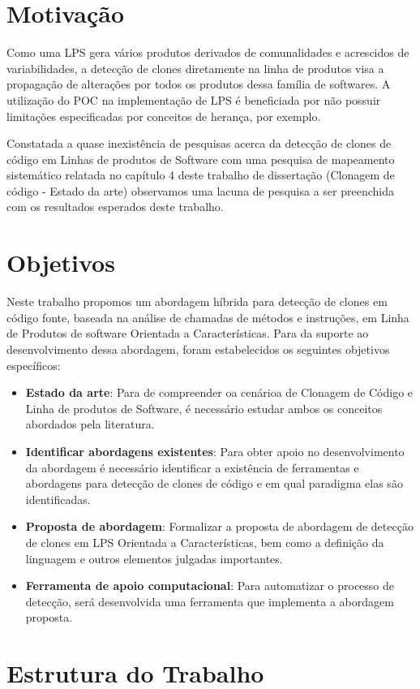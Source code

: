 \section{Motivação}
Como uma LPS gera vários produtos derivados de comunalidades e acrescidos de variabilidades, a detecção de clones diretamente na linha de produtos visa a propagação de alterações por todos os produtos dessa família de softwares. A utilização do POC na implementação de LPS é beneficiada por não possuir limitações especificadas por conceitos de herança, por exemplo.

Constatada a quase inexistência de pesquisas acerca da detecção de clones de código em Linhas de produtos de Software com uma pesquisa de mapeamento sistemático relatada no capítulo 4 deste trabalho de dissertação (Clonagem de código - Estado da arte) observamos uma lacuna de pesquisa a ser preenchida com os resultados esperados deste trabalho.

\section{Objetivos}

Neste trabalho propomos um abordagem híbrida para detecção de clones em código fonte, baseada na análise de chamadas de métodos e instruções, em Linha de Produtos de software Orientada a Características. Para da suporte ao desenvolvimento dessa abordagem, foram estabelecidos os seguintes objetivos específicos:

\begin{itemize}
	\item \textbf{Estado da arte}: Para de compreender oa cenárioa de Clonagem de Código e Linha de produtos de Software, é necessário estudar ambos os conceitos abordados pela literatura.
	
	\item \textbf{Identificar abordagens existentes}: Para obter apoio no desenvolvimento da abordagem é necessário identificar a existência de ferramentas e abordagens para detecção de clones de código e em qual paradigma elas são identificadas.   
	
	\item \textbf{Proposta de abordagem}: Formalizar a proposta de abordagem de detecção de clones em LPS Orientada a Características, bem como a definição da linguagem e outros elementos julgadas importantes.
	
	\item \textbf{Ferramenta de apoio computacional}: Para automatizar o processo de detecção, será desenvolvida uma ferramenta que implementa a abordagem proposta.
	
\end{itemize}
 
\section{Estrutura do Trabalho}




